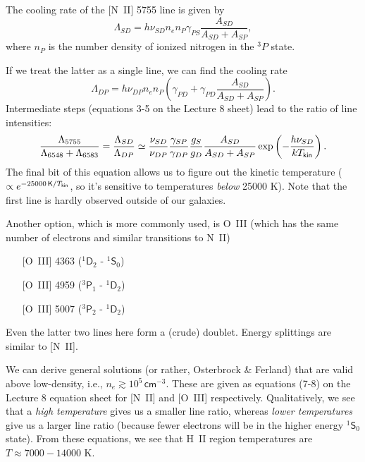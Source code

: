\documentclass{tufte-handout}
\renewcommand{\rm}{\sf}
\renewcommand{\textrm}{\textsf}
\newcommand{\HII}{\textnormal{H{\smaller~\textsc{II}}}}
\renewcommand{\smallcaps}[1]{{\smaller~\textsc{#1}}}
\newcommand{\spec}[2]{\textnormal{#1}\smallcaps{#2}} %
\newcommand{\term}[4]{$^{#1}\textrm{#2}_{#3}^{\textrm{#4}}$}
\begin{document}
The cooling rate of the [\spec{N}{II}] 5755 line is given by 
\[\Lambda_{SD} = h\nu_{SD}n_e n_P \gamma_{PS} \frac{A_{SD}}{A_{SD} + A_{SP}},\]
where $n_P$ is the number density of ionized nitrogen in the $^3P$ state.

If we treat the latter as a single line, we can find the cooling rate
\[\Lambda_{DP} = h\nu_{DP} n_e n_P \left (\gamma_{PD} + \gamma_{PD}\frac{A_{SD}}{A_{SD} + A_{SP}}\right ).\]
Intermediate steps (equations 3-5 on the Lecture 8 sheet) lead to the ratio of line intensities:
\begin{equation}
\frac{\Lambda_{5755}}{\Lambda_{6548} + \Lambda_{6583}} = \frac{\Lambda_{SD}}{\Lambda_{DP}} \simeq \frac{\nu_{SD}}{\nu_{DP}} \frac{\gamma_{SP}}{\gamma_{DP}}\frac{g_S}{g_D}\frac{A_{SD}}{A_{SD} + A_{SP}} \exp\left (-\frac{h\nu_{SD}}{kT_{\rm kin}}\right ).
\end{equation}
The final bit of this equation allows us to figure out the kinetic temperature ($\propto e^{-25000\,{\rm K} / T_{\rm kin}}$, so it's sensitive to temperatures \textit{below} 25000 K). Note that the first line is hardly observed outside of our galaxies.

Another option, which is more commonly used, is \spec{O}{III} (which has the same number of electrons and similar transitions to \spec{N}{II})
\begin{itemize}
\item[] [\spec{O}{III}] 4363 (\term{1}{D}{2}{} - \term{1}{S}{0}{})
\item[] [\spec{O}{III}] 4959 (\term{3}{P}{1}{} - \term{1}{D}{2}{})
\item[] [\spec{O}{III}] 5007 (\term{3}{P}{2}{} - \term{1}{D}{2}{})
\end{itemize}
Even the latter two lines here form a (crude) doublet. Energy splittings are similar to  [\spec{N}{II}].

We can derive general solutions (or rather, Osterbrock \& Ferland) that are valid above low-density, i.e., $n_e \gtrsim 10^{5}\, \textrm{cm}^{-3}$. These are given as equations (7-8) on the Lecture 8 equation sheet for [\spec{N}{II}] and [\spec{O}{III}] respectively. Qualitatively, we see that a \textit{high temperature} gives us a smaller line ratio, whereas \textit{lower temperatures} give us a larger line ratio (because fewer electrons will be in the higher energy \term{1}{S}{0}{} state). From these equations, we see that \HII{} region temperatures are $T \approx 7000-14000$ K.
\end{document}
